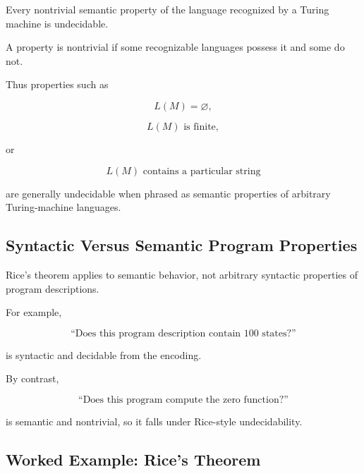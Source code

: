 \begin{theorem}
Every nontrivial semantic property of the language recognized by a Turing
machine is undecidable.
\end{theorem}

A property is nontrivial if some recognizable languages possess it and some
do not.

Thus properties such as

\[
\boxed{
L(M)=\varnothing,
}
\]

\[
\boxed{
L(M)
\text{ is finite},
}
\]

or

\[
\boxed{
L(M)
\text{ contains a particular string}
}
\]

are generally undecidable when phrased as semantic properties of arbitrary
Turing-machine languages.

\subsection{Syntactic Versus Semantic Program Properties}
\label{subsec:syntactic-semantic-program-properties}

Rice's theorem applies to semantic behavior, not arbitrary syntactic
properties of program descriptions.

For example,

\[
\boxed{
\text{``Does this program description contain 100 states?''}
}
\]

is syntactic and decidable from the encoding.

By contrast,

\[
\boxed{
\text{``Does this program compute the zero function?''}
}
\]

is semantic and nontrivial, so it falls under Rice-style undecidability.

\subsection{Worked Example: Rice's Theorem}
\label{subsec:worked-rice}

